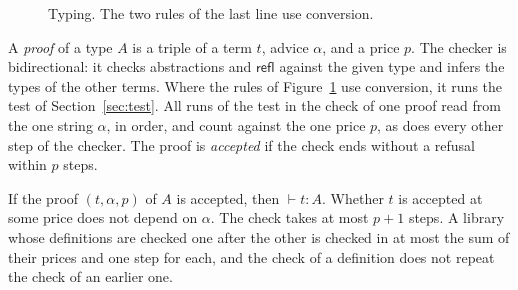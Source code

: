 \documentclass[acmsmall,nonacm,screen]{acmart}
\newcommand{\kw}[1]{\mathsf{#1}}
\newcommand{\lamx}[1]{\lambda #1.\,}
\newcommand{\rec}{\kw{rec}}
\newcommand{\suc}{\kw{S}}
\newcommand{\refl}{\kw{refl}}
\newcommand{\Nat}{\kw{Nat}}
\newcommand{\Eq}[3]{\kw{Eq}_{#1}(#2, #3)}
\newcommand{\conv}{\equiv}
\begin{document}
\begin{figure}
\caption{Typing. The two rules of the last line use conversion.}
\label{fig:typing}
\end{figure}

\begin{definition}[Proof]
\label{def:proof}
A \emph{proof} of a type $A$ is a triple of a term $t$, advice $\alpha$, and a price $p$. The
checker is bidirectional: it checks abstractions and $\refl$ against the given type and
infers the types of the other terms. Where the rules of Figure~\ref{fig:typing} use
conversion, it runs the test of Section~\ref{sec:test}. All runs of the test in the check of
one proof read from the one string $\alpha$, in order, and count against the one price $p$,
as does every other step of the checker. The proof is \emph{accepted} if the check ends
without a refusal within $p$ steps.
\end{definition}

\begin{theorem}[Proofs]
\label{thm:proofs}
If the proof $(t, \alpha, p)$ of $A$ is accepted, then $\vdash t : A$. Whether $t$ is
accepted at some price does not depend on $\alpha$. The check takes at most $p + 1$ steps.
A library whose definitions are checked one after the other is checked in at most the sum
of their prices and one step for each, and the check of a definition does not repeat the
check of an earlier one.
\end{theorem}
\end{document}

